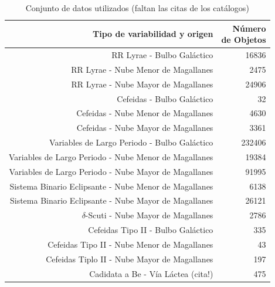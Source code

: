 \documentclass[letterpaper,12pt]{book}
\begin{document}
\begin{table}
  \centering
  \begin{tabular}{rr}
    \hline
    \hline
    Tipo de variabilidad y origen & \shortstack{Número \\de Objetos}\\
    \hline
    \hline
    RR Lyrae - Bulbo Galáctico\cite{soszynski_optical_2011-2} & 16836\\
    RR Lyrae - Nube Menor de Magallanes \cite{soszynski_optical_2010}& 2475\\
    RR Lyrae - Nube Mayor de Magallanes \cite{soszynski_optical_2009-1}& 24906\\
    \hline
    Cefeidas - Bulbo Galáctico \cite{soszynski_optical_2011}& 32\\%
    Cefeidas - Nube Menor de Magallanes \cite{soszynski_optical_2010-2}& 4630\\
    Cefeidas - Nube Mayor de Magallanes \cite{soszynski_optical_2008-1}& 3361\\
    \hline
    Variables de Largo Periodo - Bulbo Galáctico \cite{soszynski_optical_2013-1}& 232406\\
    Variables de Largo Periodo - Nube Menor de Magallanes \cite{soszynski_optical_2011-1}& 19384\\
    Variables de Largo Periodo - Nube Mayor de Magallanes \cite{soszynski_optical_2009}& 91995\\
    \hline
    Sistema Binario Eclipsante - Nube Menor de Magallanes \cite{pawlak_eclipsing_2013}& 6138\\
    Sistema Binario Eclipsante - Nube Mayor de Magallanes \cite{graczyk_optical_2011}& 26121\\
    \hline
    $\delta$-Scuti - Nube Mayor de Magallanes\cite{poleski_optical_2010} & 2786\\
    \hline
    Cefeidas Tipo II - Bulbo Galáctico \cite{soszynski_optical_2013}& 335\\
    Cefeidas Tipo II - Nube Menor de Magallanes \cite{soszynski_optical_2010-1}& 43\\
    Cefeidas Tiplo II - Nube Mayor de Magallanes \cite{soszynski_optical_2008}& 197\\
    \hline
    Cadidata a Be -  Vía Láctea (cita!) & 475\\
    \hline
    \hline 
  \end{tabular}
  \caption{Conjunto de datos utilizados (faltan las citas de los catálogos)}
  \label{cuadro:datosUsados}   
\end{table}
\end{document}
